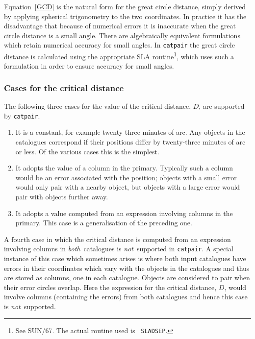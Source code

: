 \documentclass[twoside,11pt]{article}
\newcommand{\xref}[3]{#1}
\renewcommand{\_}{\texttt{\symbol{95}}}
\begin{document}
Equation~\ref{GCD} is the natural form for the great circle distance,
simply derived by applying spherical trigonometry to the two
coordinates. In practice it has the disadvantage that because of
numerical errors it is inaccurate when the great circle distance is a
small angle. There are algebraically equivalent formulations which
retain numerical accuracy for small angles. In {\tt catpair} the great
circle distance is calculated using the appropriate SLA routine\footnote{See
\xref{SUN/67}{sun67}{}\cite{SUN67}. The actual routine used is {\tt
SLA\_DSEP}.}, which uses such a formulation in order to ensure accuracy for
small angles.

\subsubsection{\label{CRIT_DIST}Cases for the critical distance}

The following three cases for the value of the critical distance,
$D$, are supported by {\tt catpair}.

\begin{enumerate}

  \item It is a constant, for example twenty-three minutes of arc.  Any
   objects in the catalogues correspond if their positions differ by
   twenty-three minutes of arc or less.  Of the various cases this is
   the simplest.

  \item It adopts the value of a column in the primary. Typically such a
   column would be an error associated with the position; objects with a
   small error would only pair with a nearby object, but objects with a
   large error would pair with objects further away.

  \item It adopts a value computed from an expression involving columns
   in the primary. This case is a generalisation of the preceding one.

\end{enumerate}

A fourth case in which the critical distance is computed from an
expression involving columns in {\it both}\, catalogues is {\it not}\,
supported in {\tt catpair}. A special instance of this case which sometimes
arises is where both input catalogues have errors in their coordinates which
vary with the objects in the catalogues and thus are stored as columns, one
in each catalogue. Objects are considered to pair when their error circles
overlap. Here the expression for the critical distance, $D$, would involve
columns (containing the errors) from both catalogues and hence this case is
{\it not}\, supported.
\end{document}
